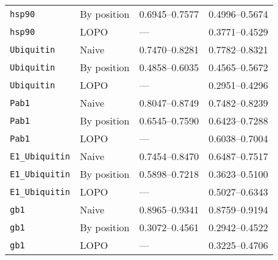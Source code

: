\documentclass[10pt, british]{beamer}
\begin{document}
\begin{frame}
\begin{tabular*}{\linewidth}{@{\extracolsep{\fill}}llll}
		\texttt{hsp90}          & By position & \numrange{0.6945}{0.7577}        & \numrange{0.4996}{0.5674}         \\
		\texttt{hsp90}          & LOPO        & ---                              & \numrange{0.3771}{0.4529}         \\
		\texttt{Ubiquitin}      & Naive       & \numrange{0.7470}{0.8281}        & \numrange{0.7782}{0.8321}         \\
		\texttt{Ubiquitin}      & By position & \numrange{0.4858}{0.6035}        & \numrange{0.4565}{0.5672}         \\
		\texttt{Ubiquitin}      & LOPO        & ---                              & \numrange{0.2951}{0.4296}         \\
		\texttt{Pab1}           & Naive       & \numrange{0.8047}{0.8749}        & \numrange{0.7482}{0.8239}         \\
		\texttt{Pab1}           & By position & \numrange{0.6545}{0.7590}        & \numrange{0.6423}{0.7288}         \\
		\texttt{Pab1}           & LOPO        & ---                              & \numrange{0.6038}{0.7004}         \\
		\texttt{E1\_Ubiquitin}  & Naive       & \numrange{0.7454}{0.8470}        & \numrange{0.6487}{0.7517}         \\
		\texttt{E1\_Ubiquitin}  & By position & \numrange{0.5898}{0.7218}        & \numrange{0.3623}{0.5100}         \\
		\texttt{E1\_Ubiquitin}  & LOPO        & ---                              & \numrange{0.5027}{0.6343}         \\
		\texttt{gb1}            & Naive       & \numrange{0.8965}{0.9341}        & \numrange{0.8759}{0.9194}         \\
		\texttt{gb1}            & By position & \numrange{0.3072}{0.4561}        & \numrange{0.2942}{0.4522}         \\
		\texttt{gb1}            & LOPO        & ---                              & \numrange{0.3225}{0.4706}         \\
		\bottomrule
	\end{tabular*}%
\end{frame}
\end{document}
